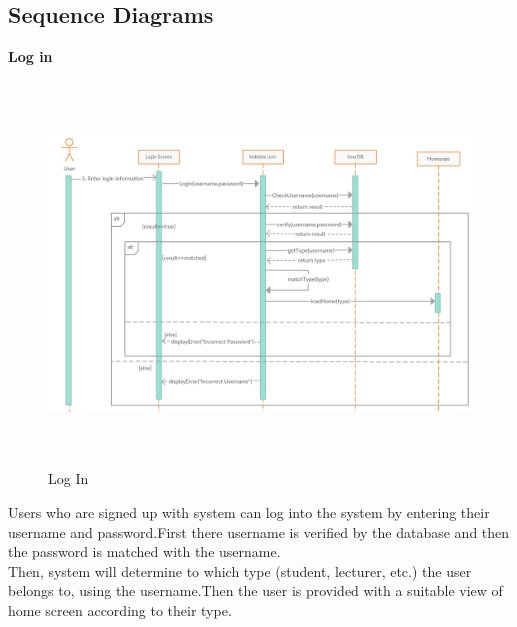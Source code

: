 \documentclass[a4paper,beamer]{article}
\begin{document}
	\subsection{Sequence Diagrams}
		\textbf{Log in}\newline
			
		\begin{figure}[h!]
			\begin{center}
			\includegraphics[width=6in,height=4in]{img/seq-login}
			\end{center}
			\caption{Log In}
			\label{fig:Log In}
		\end{figure}

		 Users who are signed up with system can log into the system by entering their username and password.First there username is verified by the database and then the password is matched with the username.\\
		 
		Then, system will determine to which type (student, lecturer, etc.) the user belongs to, using the username.Then  the user is provided with a suitable view of home screen according to their type.\newline

		\newpage
		
\end{document}
